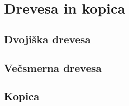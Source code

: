 \chapter{Drevesa in kopica}

\section{Dvojiška drevesa}


\section{Večsmerna drevesa}


\section{Kopica}
